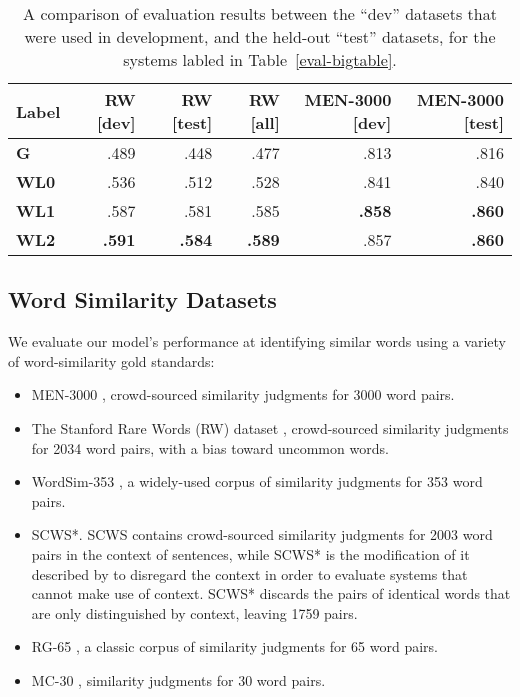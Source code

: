\documentclass[letterpaper]{article}
\begin{document}
\begin{table*}[t]
\centering
\begin{tabular}{lrrrrr}
\toprule
Label   & RW [dev] & RW [test] & RW [all] & MEN-3000 [dev] & MEN-3000 [test] \\
\midrule
\bf G   &    .489  &    .448  &    .477  &    .813  &    .816 \\
\bf WL0 &    .536  &    .512  &    .528  &    .841  &    .840 \\
\bf WL1 &    .587  &    .581  &    .585  &\bf .858  &\bf .860 \\
\bf WL2 &\bf .591  &\bf .584  &\bf .589  &    .857  &\bf .860 \\
\bottomrule
\end{tabular}

\caption{
    A comparison of evaluation results between the ``dev'' datasets that were
    used in development, and the held-out ``test'' datasets, for the systems
    labled in Table~\ref{eval-bigtable}.
}
\label{eval-dev-test}
\end{table*}

\subsection{Word Similarity Datasets}

We evaluate our model's performance at identifying similar words using a
variety of word-similarity gold standards:

\begin{itemize}
\item MEN-3000 \cite{bruni2014men}, crowd-sourced similarity judgments for 3000
    word pairs.
\item The Stanford Rare Words (RW) dataset \cite{luong2013rw}, crowd-sourced
    similarity judgments for 2034 word pairs, with a bias toward uncommon words.
\item WordSim-353 \cite{finkelstein2001ws}, a widely-used corpus of similarity
    judgments for 353 word pairs.
\item SCWS*. SCWS \cite{huang2012scws} contains crowd-sourced similarity
    judgments for 2003 word pairs in the context of sentences, while SCWS* is
    the modification of it described by 
    to disregard the context in order to evaluate
    systems that cannot make use of context. SCWS* discards the pairs of
    identical words that are only distinguished by context, leaving 1759 pairs.
\item RG-65 \cite{rubenstein1965rg}, a classic corpus of similarity judgments
    for 65 word pairs.
\item MC-30 \cite{miller1991mc}, similarity judgments for 30 word pairs.
\end{itemize}
\end{document}
